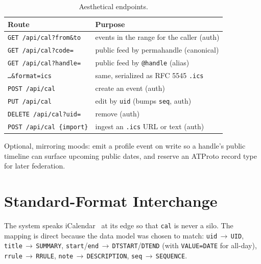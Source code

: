 \documentclass[10pt,letterpaper,twocolumn]{article}
\begin{document}
\begin{table}[h]
\small
\centering
\begin{tabularx}{\columnwidth}{l X}
\toprule
\textbf{Route} & \textbf{Purpose} \\
\midrule
\texttt{GET /api/cal?from\&to} & events in the range for the caller (auth) \\
\texttt{GET /api/cal?code=} & public feed by permahandle (canonical) \\
\texttt{GET /api/cal?handle=} & public feed by \texttt{@handle} (alias) \\
\texttt{\dots\&format=ics} & same, serialized as RFC 5545 \texttt{.ics} \\
\texttt{POST /api/cal} & create an event (auth) \\
\texttt{PUT /api/cal} & edit by \texttt{uid} (bumps \texttt{seq}, auth) \\
\texttt{DELETE /api/cal?uid=} & remove (auth) \\
\texttt{POST /api/cal \{import\}} & ingest an \texttt{.ics} URL or text (auth) \\
\bottomrule
\end{tabularx}
\caption{Aesthetical endpoints.}
\label{tab:endpoints}
\end{table}

Optional, mirroring moods: emit a profile event on write so a handle's public timeline can surface upcoming public dates, and reserve an ATProto record type for later federation.

\section{Standard-Format Interchange}

The system speaks iCalendar~\citep{rfc5545} at its edge so that \texttt{cal} is never a silo. The mapping is direct because the data model was chosen to match: \texttt{uid}\,$\to$\,\texttt{UID}, \texttt{title}\,$\to$\,\texttt{SUMMARY}, \texttt{start}/\texttt{end}\,$\to$\,\texttt{DTSTART}/\texttt{DTEND} (with \texttt{VALUE=DATE} for all-day), \texttt{rrule}\,$\to$\,\texttt{RRULE}, \texttt{note}\,$\to$\,\texttt{DESCRIPTION}, \texttt{seq}\,$\to$\,\texttt{SEQUENCE}.
\end{document}
